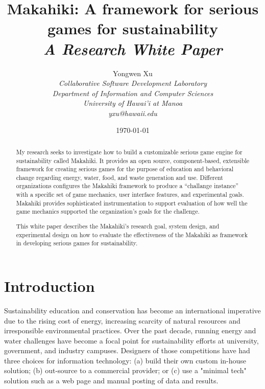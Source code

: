 \documentclass[11pt]{article}
\begin{document}
\title{Makahiki: A framework for serious games for sustainability\\
\em  A Research White Paper}

\author{
	 Yongwen Xu \\
\em  Collaborative Software Development Laboratory \\
\em  Department of Information and Computer Sciences \\
\em  University of Hawai'i at Manoa\\
     yxu@hawaii.edu \\
}

\date{\today}
\maketitle

\tableofcontents

\graphicspath{{figures/}} 

\newpage
\begin{abstract}

My research seeks to investigate how to build a customizable serious game engine for sustainability called Makahiki. It provides an open source, component-based, extensible framework for creating serious games for the purpose of education and behavioral change regarding energy, water, food, and waste generation and use. Different organizations configures the Makahiki framework to produce a ``challange instance'' with a specific set of game mechanics, user interface features, and experimental goals. Makahiki provides sophisticated instrumentation to support evaluation of how well the game mechanics supported the organization's goals for the challenge.

This white paper describes the Makahiki's research goal, system design, and experimental design on how to evaluate the effectiveness of the Makahiki as framework in developing serious games for sustainability.
\end{abstract}


\section{Introduction}

Sustainability education and conservation has become an international imperative due to the rising cost of energy, increasing scarcity of natural resources and irresponsible environmental practices. 
Over the past decade, running energy and water challenges have become a focal point for sustainability efforts at university, government, and industry campuses. Designers of those competitions have had three choices for information technology: (a) build their own custom in-house solution; (b) out-source to a commercial provider; or (c) use a "minimal tech" solution such as a web page and manual posting of data and results.
\end{document}
